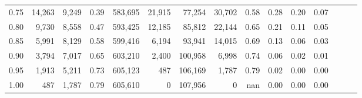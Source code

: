 \begin{tabular}{rrrrrrrrrrrrrrr}
0.75 &  14,263 &  9,249 &  0.39 &  583,695 &   21,915 &   77,254 &   30,702 &  0.58 &  0.28 &  0.20 &      0.07 \\
0.80 &   9,730 &  8,558 &  0.47 &  593,425 &   12,185 &   85,812 &   22,144 &  0.65 &  0.21 &  0.11 &      0.05 \\
0.85 &   5,991 &  8,129 &  0.58 &  599,416 &    6,194 &   93,941 &   14,015 &  0.69 &  0.13 &  0.06 &      0.03 \\
0.90 &   3,794 &  7,017 &  0.65 &  603,210 &    2,400 &  100,958 &    6,998 &  0.74 &  0.06 &  0.02 &      0.01 \\
0.95 &   1,913 &  5,211 &  0.73 &  605,123 &      487 &  106,169 &    1,787 &  0.79 &  0.02 &  0.00 &      0.00 \\
1.00 &     487 &  1,787 &  0.79 &  605,610 &        0 &  107,956 &        0 &   nan &  0.00 &  0.00 &      0.00 \\
\bottomrule
\end{tabular}
